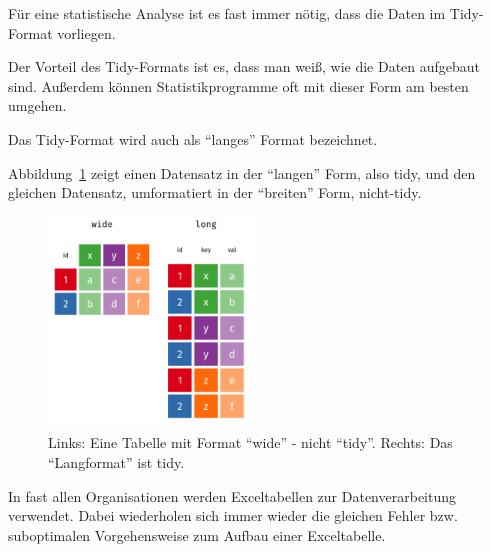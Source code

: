 \documentclass[
  a4paper,
  DIV=11]{scrreprt}
\theoremstyle{definition}
\theoremstyle{definition}
\theoremstyle{remark}
\begin{document}
\begin{tcolorbox}[enhanced jigsaw, colbacktitle=quarto-callout-important-color!10!white, title=\textcolor{quarto-callout-important-color}{\faExclamation}\hspace{0.5em}{Wichtig}, coltitle=black, opacityback=0, breakable, bottomtitle=1mm, colback=white, toptitle=1mm, opacitybacktitle=0.6, colframe=quarto-callout-important-color-frame, bottomrule=.15mm, titlerule=0mm, arc=.35mm, rightrule=.15mm, toprule=.15mm, leftrule=.75mm, left=2mm]

Für eine statistische Analyse ist es fast immer nötig, dass die Daten im
Tidy-Format vorliegen.

\end{tcolorbox}

Der Vorteil des Tidy-Formats ist es, dass man weiß, wie die Daten
aufgebaut sind. Außerdem können Statistikprogramme oft mit dieser Form
am besten umgehen.

Das Tidy-Format wird auch als ``langes'' Format bezeichnet.

Abbildung~\ref{fig-long-wide-anim} zeigt einen Datensatz in der
``langen'' Form, also tidy, und den gleichen Datensatz, umformatiert in
der ``breiten'' Form, nicht-tidy.

\begin{figure}

{\centering \includegraphics[width=0.5\textwidth,height=\textheight]{./img/long-wide-anim.png}

}

\caption{\label{fig-long-wide-anim}Links: Eine Tabelle mit Format
``wide'' - nicht ``tidy''. Rechts: Das ``Langformat'' ist tidy.}

\end{figure}

In fast allen Organisationen werden Exceltabellen zur Datenverarbeitung
verwendet. Dabei wiederholen sich immer wieder die gleichen Fehler bzw.
suboptimalen Vorgehensweise zum Aufbau einer Exceltabelle.
\end{document}
